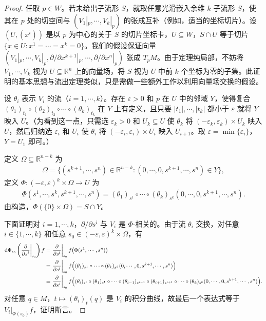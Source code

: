 \documentclass[../../main.tex]{subfiles}
\begin{document}
\begin{proof}
任取 $p\in W$。若未给出子流形 $S$，就取任意光滑嵌入余维 $k$ 子流形 $S$，使其在 $p$ 处的切空间与 $(V_1|_p,\cdots ,V_k|_p)$ 的张成互补（例如，适当的坐标切片）。设 $(U,(x^i))$ 是以 $p$ 为中心的关于 $S$ 的切片坐标卡，$U\subseteq W$，$S\cap U$ 等于切片 $\{x\in U:x^1=\cdots=x^k=0\}$。我们的假设保证向量 $(V_1|_p,\cdots ,V_k|_p,\partial/\partial x^{k+1}|_p,\cdots ,\partial/\partial x^n|_p)$ 张成 $T_pM$。由于定理纯局部，不妨将 $V_1,\cdots ,V_k$ 视为 $U\subseteq\mathbb{R}^n$ 上的向量场，将 $S$ 视为 $U$ 中前 $k$ 个坐标为零的子集。此证明的基本思想与流出定理类似，只是需做一些额外工作以利用向量场交换的假设。

设 $\theta_i$ 表示 $V_i$ 的流（$i=1,\cdots ,k$）。存在 $\varepsilon>0$ 和 $p$ 在 $U$ 中的邻域 $Y$，使得复合 $(\theta_1)_{t_1}\circ(\theta_2)_{t_2}\circ\cdots\circ(\theta_k)_{t_k}$ 在 $Y$ 上有定义，且只要 $|t_1|,\cdots ,|t_k|$ 都小于 $\varepsilon$ 就将 $Y$ 映入 $U$。（为看到这一点，只需选 $\varepsilon_k>0$ 和 $U_k\subseteq U$ 使 $\theta_k$ 将 $(-\varepsilon_k,\varepsilon_k)\times U_k$ 映入 $U$，然后归纳选 $\varepsilon_i$ 和 $U_i$ 使 $\theta_i$ 将 $(-\varepsilon_i,\varepsilon_i)\times U_i$ 映入 $U_{i+1}$。取 $\varepsilon=\min\{\varepsilon_i\}$，$Y=U_1$ 即可。）

定义 $\Omega\subseteq\mathbb{R}^{n-k}$ 为
\begin{align*}
\Omega=\{(s^{k+1},\cdots ,s^n)\in\mathbb{R}^{n-k}:(0,\cdots ,0,s^{k+1},\cdots ,s^n)\in Y\},
\end{align*}
定义 $\Phi\colon(-\varepsilon,\varepsilon)^k\times\Omega\to U$ 为
\begin{align*}
\Phi(s^1,\cdots ,s^k,s^{k+1},\cdots ,s^n)=(\theta_1)_{s^1}\circ\cdots\circ(\theta_k)_{s^k}(0,\cdots ,0,s^{k+1},\cdots ,s^n).
\end{align*}
由构造，$\Phi(\{0\}\times\Omega)=S\cap Y$。

下面证明对 $i=1,\cdots ,k$，$\partial/\partial s^i$ 与 $V_i$ 是 $\Phi$-相关的。由于流 $\theta_i$ 交换，对任意 $i\in\{1,\cdots ,k\}$ 和任意 $s_0\in(-\varepsilon,\varepsilon)^k\times\Omega$，有
\begin{align*}
\mathrm{d}\Phi_{s_0}\left(\frac{\partial}{\partial s^i}\bigg|_{s_0}\right)f
&=\left.\frac{\partial}{\partial s^i}\right|_{s_0}f\bigl(\Phi(s^1,\cdots ,s^n)\bigr)\\
&=\left.\frac{\partial}{\partial s^i}\right|_{s_0}f\Bigl((\theta_1)_{s^1}\circ\cdots\circ(\theta_k)_{s^k}(0,\cdots ,0,s^{k+1},\cdots ,s^n)\Bigr)\\
&=\left.\frac{\partial}{\partial s^i}\right|_{s_0}f\Bigl((\theta_i)_{s^i}\circ(\theta_1)_{s^1}\circ\cdots\circ(\theta_{i-1})_{s^{i-1}}\circ(\theta_{i+1})_{s^{i+1}}\circ\cdots\circ(\theta_k)_{s^k}(0,\cdots ,0,s^{k+1},\cdots ,s^n)\Bigr).
\end{align*}
对任意 $q\in M$，$t\mapsto(\theta_i)_t(q)$ 是 $V_i$ 的积分曲线，故最后一个表达式等于 $V_i|_{\Phi(s_0)}f$，证明断言。


\end{proof}
\end{document}

